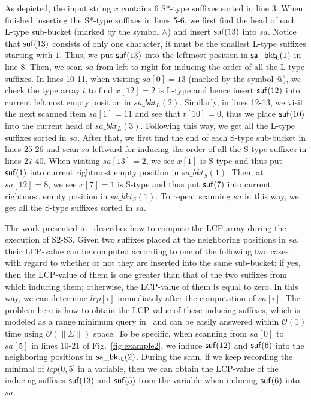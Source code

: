\documentclass[10pt,journal,compsoc]{IEEEtran}
\begin{document}
As depicted, the input string $x$ contains 6 S*-type suffixes sorted in line 3. When finished inserting the S*-type suffixes in lines 5-6, we first find the head of each L-type sub-bucket (marked by the symbol $\wedge$) and insert ${\sf suf}(13)$ into $sa$. Notice that ${\sf suf}(13)$ consists of only one character, it must be the smallest L-type suffixes starting with $1$. Thus, we put ${\sf suf}(13)$ into the leftmost position in ${\sf sa\_bkt_L}(1)$ in line 8. Then, we scan $sa$ from left to right for inducing the order of all the L-type suffixes. In lines 10-11, when visiting $sa[0] = 13$ (marked by the symbol $@$), we check the type array $t$ to find $x[12] = 2$ is L-type and hence insert ${\sf suf}(12)$ into current leftmost empty position in $sa\_bkt_L(2)$. Similarly, in lines 12-13, we visit the next scanned item $sa[1] = 11$ and see that $t[10] = 0$, thus we place ${\sf suf}(10)$ into the current head of $sa\_bkt_L(3)$. Following this way, we get all the L-type suffixes sorted in $sa$. After that, we first find the end of each S-type sub-bucket in lines 25-26 and scan $sa$ leftward for inducing the order of all the S-type suffixes in lines 27-40. When visiting $sa[13] = 2$, we see $x[1]$ is S-type and thus put ${\sf suf}(1)$ into current rightmost empty position in $sa\_bkt_S(1)$. Then, at $sa[12] = 8$, we see $x[7] = 1$ is S-type and thus put ${\sf suf}(7)$ into current rightmost empty position in $sa\_bkt_S(1)$. To repeat scanning $sa$ in this way, we get all the S-type suffixes sorted in $sa$. 

The work presented in~\cite{Fischer11} describes how to compute the LCP array during the execution of S2-S3. Given two suffixes placed at the neighboring positions in $sa$, their LCP-value can be computed according to one of the following two cases with regard to whether or not they are inserted into the same sub-bucket: if yes, then the LCP-value of them is one greater than that of the two suffixes from which inducing them; otherwise, the LCP-value of them is equal to zero. In this way, we can determine $lcp[i]$ immediately after the computation of $sa[i]$. The problem here is how to obtain the LCP-value of these inducing suffixes, which is modeled as a range minimum query in~\cite{Fischer11} and can be easily answered within $\mathcal{O}(1)$ time using $\mathcal{O}(\|\Sigma\|)$ space. To be specific, when scanning from $sa[0]$ to $sa[5]$ in lines 10-21 of Fig.~\ref{fig:example2}, we induce ${\sf suf}(12)$ and ${\sf suf}(6)$ into the neighboring positions in ${\sf sa\_bkt_L(2)}$. During the scan, if we keep recording the minimal of $lcp(0, 5]$ in a variable, then we can obtain the LCP-value of the inducing suffixes ${\sf suf}(13)$ and ${\sf suf}(5)$ from the variable when inducing ${\sf suf}(6)$ into $sa$. 
\end{document}
